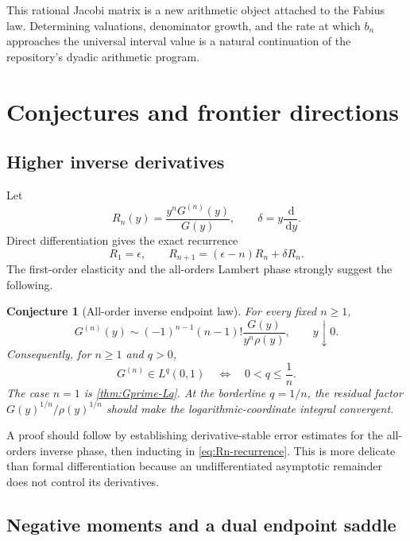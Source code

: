 \documentclass[11pt,oneside]{article}
\newtheorem{conjecture}[theorem]{Conjecture}
\theoremstyle{definition}
\theoremstyle{remark}
\newcommand{\dd}{\,\mathrm d}
\begin{document}
This rational Jacobi matrix is a new arithmetic object attached to the Fabius law.  Determining valuations, denominator growth, and the rate at which $b_n$ approaches the universal interval value is a natural continuation of the repository's dyadic arithmetic program.

\section{Conjectures and frontier directions}

\subsection{Higher inverse derivatives}

Let
\begin{equation}
 R_n(y)=\frac{y^nG^{(n)}(y)}{G(y)},
 \qquad \delta=y\frac{\dd}{\dd y}.
\end{equation}
Direct differentiation gives the exact recurrence
\begin{equation}\label{eq:Rn-recurrence}
 R_1=\epsilon,
 \qquad
 R_{n+1}=(\epsilon-n)R_n+\delta R_n.
\end{equation}
The first-order elasticity and the all-orders Lambert phase strongly suggest the following.

\begin{conjecture}[All-order inverse endpoint law]\label{conj:inverse-derivatives}
For every fixed $n\ge1$,
\begin{equation}\label{eq:inverse-derivative-conjecture}
 G^{(n)}(y)\sim(-1)^{n-1}(n-1)!
 \frac{G(y)}{y^n\rho(y)},
 \qquad y\downarrow0.
\end{equation}
Consequently, for $n\ge1$ and $q>0$,
\begin{equation}\label{eq:higher-inverse-Lq-conjecture}
 G^{(n)}\in L^q(0,1)
 \quad\Longleftrightarrow\quad 0<q\le\frac1n.
\end{equation}
The case $n=1$ is \cref{thm:Gprime-Lq}.  At the borderline $q=1/n$, the residual factor $G(y)^{1/n}/\rho(y)^{1/n}$ should make the logarithmic-coordinate integral convergent.
\end{conjecture}

A proof should follow by establishing derivative-stable error estimates for the all-orders inverse phase, then inducting in \eqref{eq:Rn-recurrence}.  This is more delicate than formal differentiation because an undifferentiated asymptotic remainder does not control its derivatives.

\subsection{Negative moments and a dual endpoint saddle}
\end{document}
